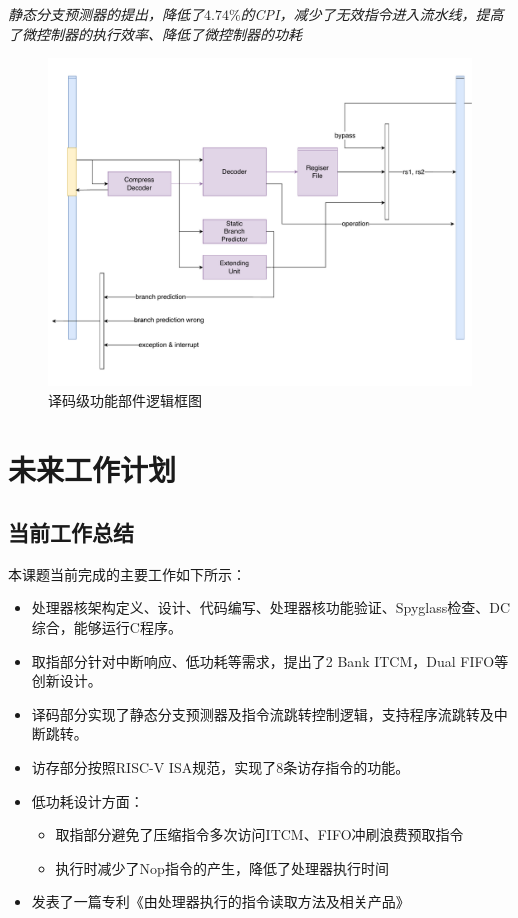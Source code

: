 \documentclass[a4paper, 12pt]{article}
\begin{document}
  \textit{静态分支预测器的提出，降低了$4.74\%$的CPI，减少了无效指令进入流水线，提高了微控制器的执行效率、降低了微控制器的功耗}
  \begin{figure}[htbp]
    \centering
    \includegraphics[width=0.8\linewidth]{./images/id_top.pdf}
    \caption{译码级功能部件逻辑框图}
    \label{fig:id_top}
  \end{figure}

\newpage
\section{未来工作计划}%
\subsection{当前工作总结}

本课题当前完成的主要工作如下所示：
\begin{itemize}
  \item 处理器核架构定义、设计、代码编写、处理器核功能验证、Spyglass检查、DC综合，能够运行C程序。
  \item 取指部分针对中断响应、低功耗等需求，提出了2 Bank ITCM，Dual FIFO等创新设计。
  \item 译码部分实现了静态分支预测器及指令流跳转控制逻辑，支持程序流跳转及中断跳转。
  \item 访存部分按照RISC-V ISA规范，实现了8条访存指令的功能。
  \item 低功耗设计方面：
  \begin{itemize}
    \item 取指部分避免了压缩指令多次访问ITCM、FIFO冲刷浪费预取指令
    \item 执行时减少了Nop指令的产生，降低了处理器执行时间
  \end{itemize}
  \item 发表了一篇专利《由处理器执行的指令读取方法及相关产品》
\end{itemize}
\end{document}
